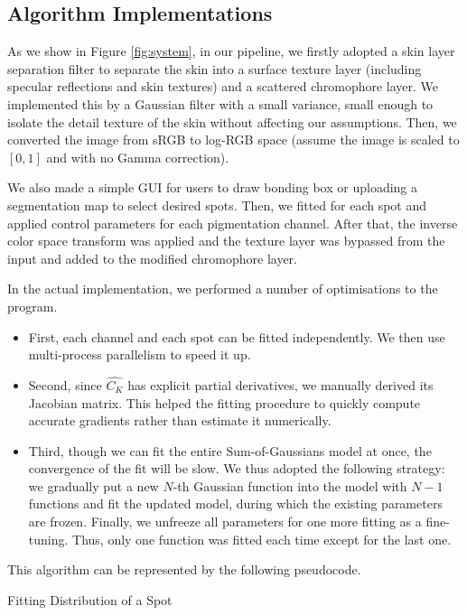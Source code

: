 \begin{spacing}{1.5}
\subsection{Algorithm Implementations}

As we show in Figure \ref{fig:system}, in our pipeline, we firstly adopted a skin layer separation filter to separate the skin into a surface texture layer (including specular reflections and skin textures) and a scattered chromophore layer. We implemented this by a Gaussian filter with a small variance, small enough to isolate the detail texture of the skin without affecting our assumptions. Then, we converted the image from sRGB to log-RGB space (assume the image is scaled to $[0,1]$ and with no Gamma correction).

We also made a simple GUI for users to draw bonding box or uploading a segmentation map to select desired spots. Then, we fitted for each spot and applied control parameters for each pigmentation channel. After that, the inverse color space transform was applied and the texture layer was bypassed from the input and added to the modified chromophore layer.

In the actual implementation, we performed a number of optimisations to the program. 
\begin{itemize}
    \item First, each channel and each spot can be fitted independently. We then use multi-process parallelism to speed it up.
    \item Second, since $\hat{C_K}$ has explicit partial derivatives, we manually derived its Jacobian matrix. This helped the fitting procedure to quickly compute accurate gradients rather than estimate it numerically.
    \item Third, though we can fit the entire Sum-of-Gaussians model at once, the convergence of the fit will be slow. We thus adopted the following strategy: we gradually put a new $N$-th Gaussian function into the model with $N-1$ functions and fit the updated model, during which the existing parameters are frozen. Finally, we unfreeze all parameters for one more fitting as a fine-tuning. Thus, only one function was fitted each time except for the last one.
\end{itemize}

This algorithm can be represented by the following pseudocode.
\begin{algorithm}
    \caption{Fitting Distribution of a Spot}
    \begin{algorithmic}[1]
    

\end{algorithmic}
\end{algorithm}
\end{spacing}
